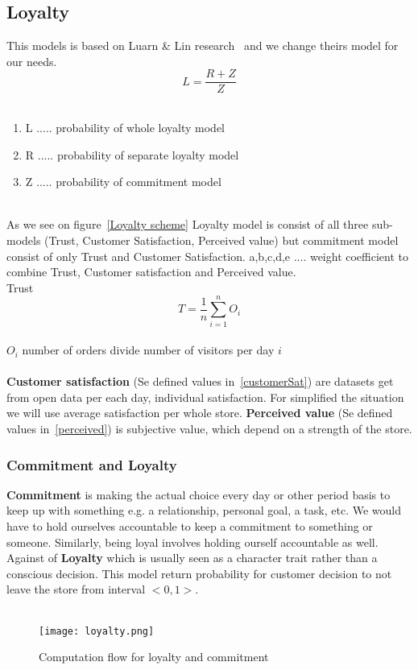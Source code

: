 \subsection{Loyalty} \label{subsec:model_loyalty}
This models is based on Luarn \& Lin research~\cite{luarn} and we change theirs model for our needs.\\
\begin{equation} \label{eq:30}
L = \frac{R+Z}{Z}
\end{equation}
\\
\begin{enumerate}
    \item L ..... probability of whole loyalty model
    \item R ..... probability of separate loyalty model
    \item Z ..... probability of commitment model
\end{enumerate}
\\
As we see on figure~\ref{Loyalty scheme} Loyalty model is consist of all three sub-models (Trust, Customer Satisfaction, Perceived value)
but commitment model consist of only Trust and Customer Satisfaction.
a,b,c,d,e .... weight coefficient to combine Trust, Customer satisfaction and Perceived value.\\
\newpage
Trust
\begin{equation} \label{eq:31}
T = \frac{1}{n} \sum_{i=1}^{n} O_i
\end{equation}
\\
$O_i$ number of orders divide number of visitors per day $i$
\\
\\
\textbf{Customer satisfaction} (Se defined values in~\ref{customerSat}) are datasets get from open data per each day, individual satisfaction.
For simplified the situation we will use average satisfaction per whole store.
\textbf{Perceived value} (Se defined values in~\ref{perceived}) is subjective value, which depend on a strength of the store.
\subsubsection{Commitment and Loyalty} \label{subsubsec:model_loyalty_commitment}
\textbf{Commitment} is making the actual choice every day or other period basis to keep up with something e.g. a relationship, personal goal, a task, etc.
We would have to hold ourselves accountable to keep a commitment to something or someone.
Similarly, being loyal involves holding ourself accountable as well.
Against of \textbf{Loyalty} which is usually seen as a character trait rather than a conscious decision.
This model return probability for customer decision to not leave the store from interval $<0,1>$.\\
\\
\begin{figure}[h!]
    \begin{center}
        \texttt{[image: loyalty.png]}
    \end{center}
    \caption{Computation flow for loyalty and commitment}
    \label{Loyalty scheme~\cite{luarn}}
\end{figure}\\
\newpage
